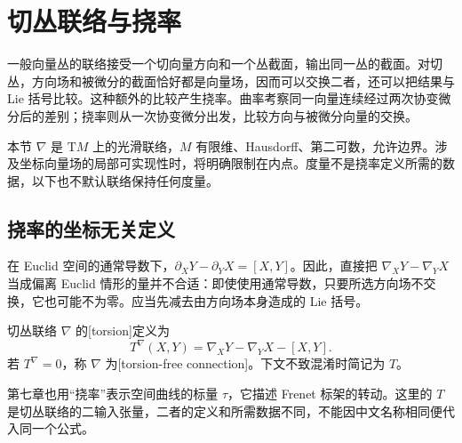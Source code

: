 
% 
% 

\section{切丛联络与挠率}
\label{g1:sec:1504}

一般向量丛的联络接受一个切向量方向和一个丛截面，输出同一丛的截面。对切丛，方向场和被微分的截面恰好都是向量场，因而可以交换二者，还可以把结果与 Lie 括号比较。这种额外的比较产生挠率。曲率考察同一向量连续经过两次协变微分后的差别；挠率则从一次协变微分出发，比较方向与被微分向量的交换。

\ProseParagraphBreak

本节 \(\nabla\) 是 \(\mathrm{T}M\) 上的光滑联络，\(M\) 有限维、Hausdorff、第二可数，允许边界。涉及坐标向量场的局部可实现性时，将明确限制在内点。度量不是挠率定义所需的数据，以下也不默认联络保持任何度量。

\subsection{挠率的坐标无关定义}
\label{g1:subsec:1504:01}

在 Euclid 空间的通常导数下，\(\partial_XY-\partial_YX=[X,Y]\)。因此，直接把 \(\nabla_XY-\nabla_YX\) 当成偏离 Euclid 情形的量并不合适：即使使用通常导数，只要所选方向场不交换，它也可能不为零。应当先减去由方向场本身造成的 Lie 括号。

\begin{definition}[挠率]\label{g1:def:torsion}
	切丛联络 \(\nabla\) 的[torsion]定义为
	\begin{equation}\label{g1:eq:torsion-definition}
		T^\nabla(X,Y)=\nabla_XY-\nabla_YX-[X,Y].
	\end{equation}
	若 \(T^\nabla=0\)，称 \(\nabla\) 为[torsion-free connection]。下文不致混淆时简记为 \(T\)。
\end{definition}

第七章也用“挠率”表示空间曲线的标量 \(\tau\)，它描述 Frenet 标架的转动。这里的 \(T\) 是切丛联络的二输入张量，二者的定义和所需数据不同，不能因中文名称相同便代入同一个公式。


